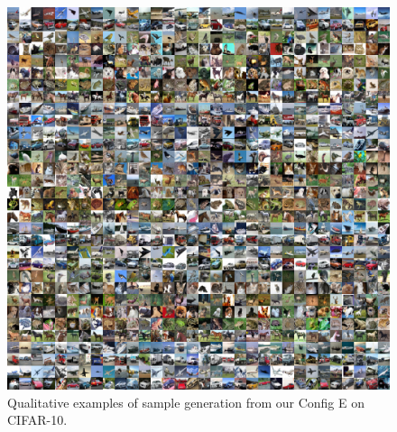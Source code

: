 {
\begin{figure}[h!]
    \setlength{\imgsize}{0.2\linewidth} %
    
    \setlength{\tabcolsep}{0pt} %
    \renewcommand{\arraystretch}{0} %

    \centering
    
    \includegraphics[width=\linewidth]{figures/qualitative/cifar-10-000222209.jpg}
    \caption{Qualitative examples of sample generation from our Config E on CIFAR-10.}
    \label{fig:cifar10}
\end{figure}
}